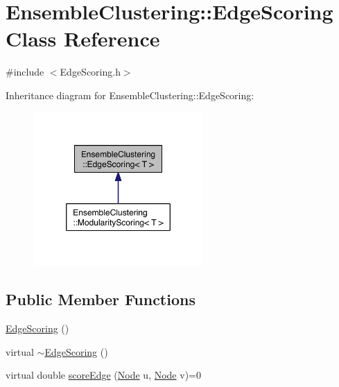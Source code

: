 \hypertarget{class_ensemble_clustering_1_1_edge_scoring}{\section{Ensemble\-Clustering\-:\-:Edge\-Scoring Class Reference}
\label{class_ensemble_clustering_1_1_edge_scoring}
}


{\ttfamily \#include $<$Edge\-Scoring.\-h$>$}



Inheritance diagram for Ensemble\-Clustering\-:\-:Edge\-Scoring\-:\nopagebreak
\begin{figure}[H]
\begin{center}
\leavevmode
\includegraphics[width=184pt]{class_ensemble_clustering_1_1_edge_scoring__inherit__graph}
\end{center}
\end{figure}
\subsection*{Public Member Functions}
\begin{DoxyCompactItemize}
\item 
\hyperlink{class_ensemble_clustering_1_1_edge_scoring_a83339193ebf55255b09a34a2e1112eea}{Edge\-Scoring} ()
\item 
virtual \hyperlink{class_ensemble_clustering_1_1_edge_scoring_a1bb790ce6fd801ea40e0603785c73727}{$\sim$\-Edge\-Scoring} ()
\item 
virtual double \hyperlink{class_ensemble_clustering_1_1_edge_scoring_ae0b8ed83c76ea8f71f8246949d3106f4}{score\-Edge} (\hyperlink{namespace_ensemble_clustering_a136bcdc52fb2f62a89bc8bf8c1a7cb8f}{Node} u, \hyperlink{namespace_ensemble_clustering_a136bcdc52fb2f62a89bc8bf8c1a7cb8f}{Node} v)=0
\end{DoxyCompactItemize}


